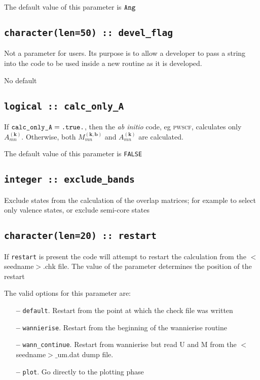  The default value of this parameter is $\verb#Ang#$

\subsection[devel\_flag]{\tt character(len=50) :: devel\_flag}

Not a parameter for users. Its purpose is to allow a developer to pass a
string into the code to be used inside a new routine as it is developed.

No default

\subsection[calc\_only\_A]{\tt logical :: calc\_only\_A}

If $\verb#calc_only_A#=\verb#.true.#$, then the \textit{ab initio}
code, eg \textsc{pwscf},
calculates only $A_{mn}^{(\mathbf{k})}$. Otherwise, both
$M_{mn}^{(\mathbf{k,b})}$ and $A_{mn}^{(\mathbf{k})}$ are
calculated.

The default value of this parameter is \verb#FALSE#


\subsection[exclude\_bands]{\tt integer :: exclude\_bands}

Exclude states from the calculation of the overlap matrices; for example to select only valence states, or exclude semi-core states

\subsection[restart]{\tt character(len=20) :: restart}

If \verb#restart# is present the code will attempt to restart the calculation
from the $<$seedname$>$.chk file. The value of the parameter
determines the position of the restart

The valid options for this parameter are:
\begin{itemize}
\item[{\bf --}]  \verb#default#. Restart from the point at which the
  check file was written  
\item[{\bf --}]  \verb#wannierise#. Restart from the beginning of the
  wannierise routine 
\item[{\bf --}]  \verb#wann_continue#. Restart from wannierise but read U and M from the $<$seedname$>\_$um.dat dump file.
\item[{\bf --}]  \verb#plot#. Go directly to the plotting phase 


\end{itemize}



